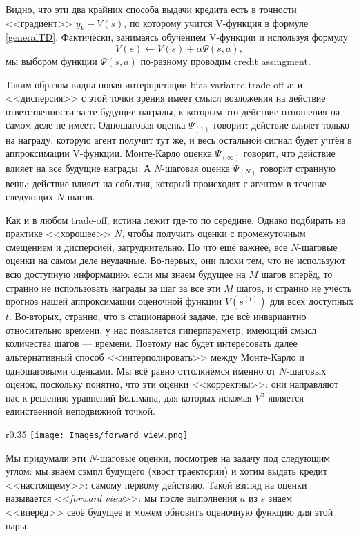 Видно, что эти два крайних способа выдачи кредита есть в точности <<градиент>> $y_V - V(s)$, по которому учится V-функция в формуле \eqref{generalTD}. Фактически, занимаясь обучением V-функции и используя формулу
\begin{equation*}
V(s) \leftarrow V(s) + \alpha \Psi(s, a),
\end{equation*}
мы выбором функции $\Psi(s, a)$ по-разному проводим credit assingment. 

Таким образом видна новая интерпретации bias-variance trade-off-а: и <<дисперсия>> с этой точки зрения имеет смысл возложения на действие ответственности за те будущие награды, к которым это действие отношения на самом деле не имеет. Одношаговая оценка $\Psi_{(1)}$ говорит: действие влияет только на награду, которую агент получит тут же, и весь остальной сигнал будет учтён в аппроксимации V-функции. Монте-Карло оценка $\Psi_{(\infty)}$ говорит, что действие влияет на все будущие награды. А $N$-шаговая оценка $\Psi_{(N)}$ говорит странную вещь: действие влияет на события, который происходят с агентом в течение следующих $N$ шагов.

Как и в любом trade-off, истина лежит где-то по середине. Однако подбирать на практике <<хорошее>> $N$, чтобы получить оценки с промежуточным смещением и дисперсией, затруднительно. Но что ещё важнее, все $N$-шаговые оценки на самом деле неудачные. Во-первых, они плохи тем, что не используют всю доступную информацию: если мы знаем будущее на $M$ шагов вперёд, то странно не использовать награды за шаг за все эти $M$ шагов, и странно не учесть прогноз нашей аппроксимации оценочной функции $V(s^{(t)})$ для всех доступных $t$. Во-вторых, странно, что в стационарной задаче, где всё инвариантно относительно времени, у нас появляется гиперпараметр, имеющий смысл количества шагов --- времени. Поэтому нас будет интересовать далее альтернативный способ <<интерполировать>> между Монте-Карло и одношаговыми оценками. Мы всё равно оттолкнёмся именно от $N$-шаговых оценок, поскольку понятно, что эти оценки <<корректны>>: они направляют нас к решению уравнений Беллмана, для которых искомая $V^\pi$ является единственной неподвижной точкой.

\begin{wrapfigure}{r}{0.35\textwidth}
\centering
\texttt{[image: Images/forward\_view.png]}
\vspace{-0.5cm}
\end{wrapfigure}
Мы придумали эти $N$-шаговые оценки, посмотрев на задачу под следующим углом: мы знаем сэмпл будущего (хвост траектории) и хотим выдать кредит <<настоящему>>: самому первому действию. Такой взгляд на оценки называется <<\emph{forward view}>>: мы после выполнения $a$ из $s$ знаем <<вперёд>> своё будущее и можем обновить оценочную функцию для этой пары.

